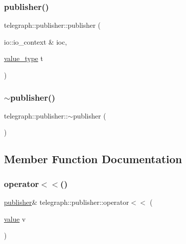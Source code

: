 \subsubsection{\texorpdfstring{publisher()}{publisher()}}
{\footnotesize\ttfamily telegraph\+::publisher\+::publisher (\begin{DoxyParamCaption}\item[{io\+::io\+\_\+context \&}]{ioc,  }\item[{\hyperlink{classtelegraph_1_1value__type}{value\+\_\+type}}]{t }\end{DoxyParamCaption})\hspace{0.3cm}{\ttfamily [inline]}}

\mbox{\label{classtelegraph_1_1publisher_a69bd0368a3a03a2a26c45768cabaaea6}} 
\subsubsection{\texorpdfstring{$\sim$publisher()}{~publisher()}}
{\footnotesize\ttfamily telegraph\+::publisher\+::$\sim$publisher (\begin{DoxyParamCaption}{ }\end{DoxyParamCaption})\hspace{0.3cm}{\ttfamily [inline]}}



\subsection{Member Function Documentation}
\mbox{\label{classtelegraph_1_1publisher_a48b08a6577fd2b047186217adbfa5b83}} 
\subsubsection{\texorpdfstring{operator$<$$<$()}{operator<<()}}
{\footnotesize\ttfamily \hyperlink{classtelegraph_1_1publisher}{publisher}\& telegraph\+::publisher\+::operator$<$$<$ (\begin{DoxyParamCaption}\item[{\hyperlink{classtelegraph_1_1value}{value}}]{v }\end{DoxyParamCaption})\hspace{0.3cm}{\ttfamily [inline]}}

